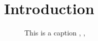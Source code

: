 \chapter{Introduction}
\label{ch:introduction}
\lipsum
\begin{figure}
	\centering
	
	\caption{This is a caption \cite{Birkfellner1998}, \cite{Islam2018}, \cite{Szafraniec2010}}
\end{figure}

\cite{Birkfellner1998,Islam2018,Szafraniec2010}

